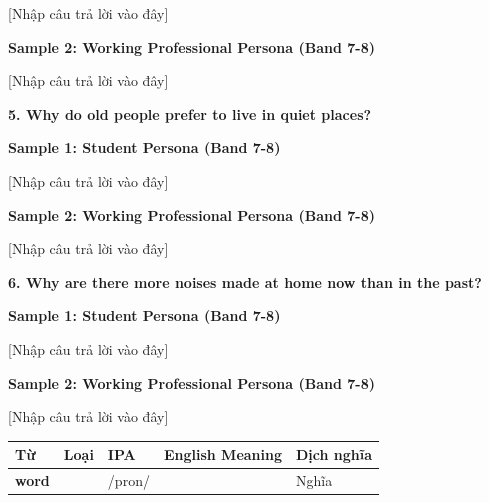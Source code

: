 [Nhập câu trả lời vào đây]

\textbf{Sample 2: Working Professional Persona (Band 7-8)}

[Nhập câu trả lời vào đây]

\separator

\begin{ieltsquestion}
\textbf{5. Why do old people prefer to live in quiet places?}
\end{ieltsquestion}
\textbf{Sample 1: Student Persona (Band 7-8)}

[Nhập câu trả lời vào đây]

\textbf{Sample 2: Working Professional Persona (Band 7-8)}

[Nhập câu trả lời vào đây]

\separator

\begin{ieltsquestion}
\textbf{6. Why are there more noises made at home now than in the past?}
\end{ieltsquestion}
\textbf{Sample 1: Student Persona (Band 7-8)}

[Nhập câu trả lời vào đây]

\textbf{Sample 2: Working Professional Persona (Band 7-8)}

[Nhập câu trả lời vào đây]

\separator


\vspace{0.8em}
\begin{center}
\renewcommand{\arraystretch}{1.65}
\begin{tabularx}{\textwidth}{|V{0.22\textwidth}|C{0.07\textwidth}|I{0.20\textwidth}|Y|V{0.18\textwidth}|}
\hline
{}
\textbf{Từ} & \textbf{Loại} & \textbf{IPA} & \textbf{English Meaning} & \textbf{Dịch nghĩa} \\
\hline
\textbf{word} & & /pron/ & & Nghĩa \\ \hline
\end{tabularx}
\end{center}

\newpage

